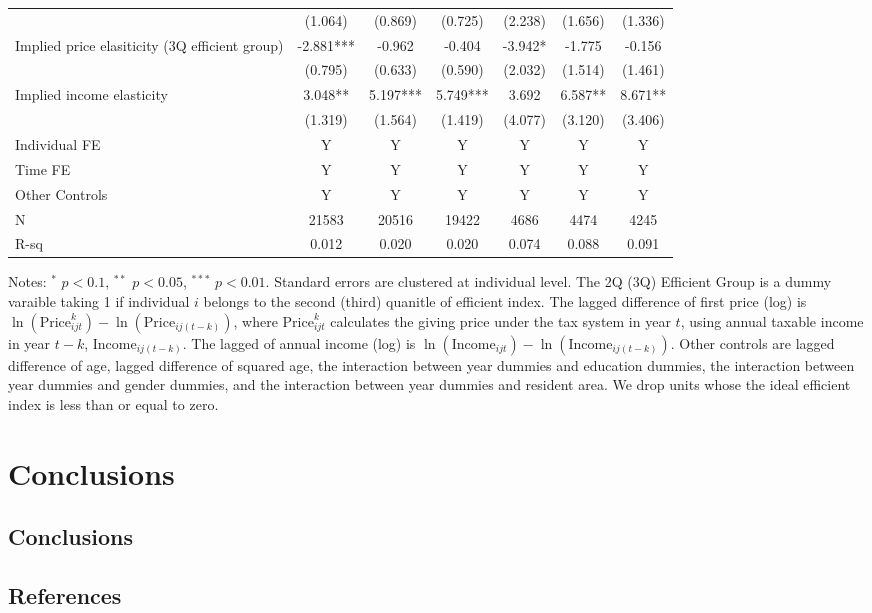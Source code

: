 \documentclass[ review  , 3p ]{elsarticle}
\begin{document}
\begin{table}
\begin{threeparttable}
\begin{tabular}[t]{lcccccc}
   & (1.064) & (0.869) & (0.725) & (2.238) & (1.656) & (1.336)\\
  Implied price elasiticity (3Q efficient group) & -2.881*** & -0.962 & -0.404 & -3.942* & -1.775 & -0.156\\
   & (0.795) & (0.633) & (0.590) & (2.032) & (1.514) & (1.461)\\
  Implied income elasticity & 3.048** & 5.197*** & 5.749*** & 3.692 & 6.587** & 8.671**\\
   & (1.319) & (1.564) & (1.419) & (4.077) & (3.120) & (3.406)\\
  Individual FE & Y & Y & Y & Y & Y & Y\\
  Time FE & Y & Y & Y & Y & Y & Y\\
  Other Controls & Y & Y & Y & Y & Y & Y\\
  N & 21583 & 20516 & 19422 & 4686 & 4474 & 4245\\
  R-sq & 0.012 & 0.020 & 0.020 & 0.074 & 0.088 & 0.091\\
  \bottomrule
  \end{tabular}
  \begin{tablenotes}
  \item Notes: $^{*}$ $p < 0.1$, $^{**}$ $p < 0.05$, $^{***}$ $p < 0.01$. Standard errors are clustered at individual level. The 2Q (3Q) Efficient Group is a dummy varaible taking 1 if individual $i$ belongs to the second (third) quanitle of efficient index. The lagged difference of first price (log) is $\ln(\text{Price}^k_{ijt}) - \ln(\text{Price}_{ij(t-k)})$, where $\text{Price}^k_{ijt}$ calculates the giving price under the tax system in year $t$, using annual taxable income in year $t-k$, $\text{Income}_{ij(t-k)}$. The lagged of annual income (log) is $\ln(\text{Income}_{ijt}) - \ln(\text{Income}_{ij(t-k)})$. Other controls are lagged difference of age, lagged difference of squared age, the interaction between year dummies and education dummies, the interaction between year dummies and gender dummies, and the interaction between year dummies and resident area. We drop units whose the ideal efficient index is less than or equal to zero.
  \end{tablenotes}
  \end{threeparttable}
  \end{table}
  
  \hypertarget{conclusions}{%
  \section{Conclusions}\label{conclusions}}
  
  \hypertarget{conclusions-1}{%
  \subsection{Conclusions}\label{conclusions-1}}
  
  \clearpage
  
  \hypertarget{references}{%
  \subsection*{References}\label{references}}
\end{document}
